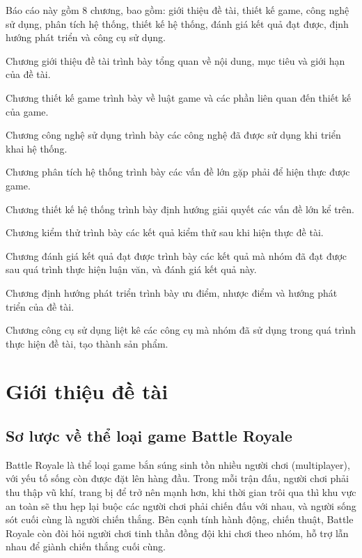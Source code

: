 \documentclass[12pt,a4paper]{article}
\begin{document}
  Báo cáo này gồm 8 chương, bao gồm: giới thiệu đề tài, thiết kế game, công nghệ sử dụng, phân tích hệ thống, thiết kế hệ thống, đánh giá kết quả đạt được, định hướng phát triển và công cụ sử dụng.
  
  Chương giới thiệu đề tài trình bày tổng quan về nội dung, mục tiêu và giới hạn của đề tài.

  Chương thiết kế game trình bày về luật game và các phần liên quan đến thiết kế của game.
  
  Chương công nghệ sử dụng trình bày các công nghệ đã được sử dụng khi triển khai hệ thống.
  
  Chương phân tích hệ thống trình bày các vấn đề lớn gặp phải để hiện thực được game.
  
  Chương thiết kế hệ thống trình bày định hướng giải quyết các vấn đề lớn kể trên.

  Chương kiểm thử trình bày các kết quả kiểm thử sau khi hiện thực đề tài.

  Chương đánh giá kết quả đạt được trình bày các kết quả mà nhóm đã đạt được sau quá trình thực hiện luận văn, và đánh giá kết quả này.
  
  Chương định hướng phát triển trình bày ưu điểm, nhược điểm và hướng phát triển của đề tài.

  Chương công cụ sử dụng liệt kê các công cụ mà nhóm đã sử dụng trong quá trình thực hiện đề tài, tạo thành sản phẩm.
  
  \newpage
  \tableofcontents
  
  \newpage
  \renewcommand\listfigurename{Danh sách hình ảnh}
  \listoffigures
  
  \newpage
  \listoftables
  
  \newpage
  \section{Giới thiệu đề tài}
  \subsection{Sơ lược về thể loại game Battle Royale}

  Battle Royale là thể loại game bắn súng sinh tồn nhiều người chơi (multiplayer), với yếu tố sống còn được đặt lên hàng đầu. Trong mỗi trận đấu, người chơi phải thu thập vũ khí, trang bị để trở nên mạnh hơn, khi thời gian trôi qua thì khu vực an toàn sẽ thu hẹp lại buộc các người chơi phải chiến đấu với nhau, và người sống sót cuối cùng là người chiến thắng. Bên cạnh tính hành động, chiến thuật, Battle Royale còn đòi hỏi người chơi tinh thần đồng đội khi chơi theo nhóm, hỗ trợ lẫn nhau để giành chiến thắng cuối cùng.
\end{document}
